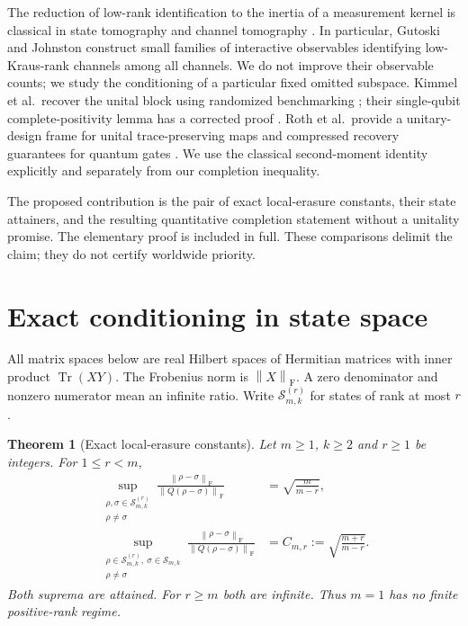 \documentclass[11pt,a4paper]{article}
\newtheorem{theorem}{Theorem}
\newcommand{\Tr}{\operatorname{Tr}}
\newcommand{\F}{\mathrm F}
\newcommand{\cS}{\mathcal S}
\newcommand{\norm}[1]{\left\lVert#1\right\rVert_{\F}}
\begin{document}
The reduction of low-rank identification to the inertia of a measurement
kernel is classical in state tomography
\cite{carmeli} and channel tomography \cite{gutoski}.
In particular, Gutoski and Johnston construct small families of
interactive observables identifying low-Kraus-rank channels among all
channels. We do not improve their observable counts; we study the
conditioning of a particular fixed omitted subspace.
Kimmel et al.\ recover the unital block using randomized benchmarking
\cite{kimmel}; their single-qubit complete-positivity lemma has a
corrected proof \cite{erratum}. Roth et al.\ provide a unitary-design
frame for unital trace-preserving maps and compressed recovery
guarantees for quantum gates \cite{roth}. We use the classical
second-moment identity explicitly and separately from our completion
inequality.

The proposed contribution is the pair of exact local-erasure constants,
their state attainers, and the resulting quantitative completion
statement without a unitality promise. The elementary proof is included
in full. These comparisons delimit the claim; they do not certify
worldwide priority.

\section{Exact conditioning in state space}
All matrix spaces below are real Hilbert spaces of Hermitian matrices
with inner product $\Tr(XY)$. The Frobenius norm is $\norm X$.
A zero denominator and nonzero numerator mean an infinite ratio.
Write $\cS^{(r)}_{m,k}$ for states of rank at most $r$.

\begin{theorem}[Exact local-erasure constants]\label{thm:sharp}
Let $m\ge1$, $k\ge2$ and $r\ge1$ be integers. For $1\le r<m$,
\begin{align}
 \sup_{\substack{\rho,\sigma\in\cS^{(r)}_{m,k}\\\rho\ne\sigma}}
 \frac{\norm{\rho-\sigma}}{\norm{Q(\rho-\sigma)}}
 &=\sqrt{\frac{m}{m-r}}, \label{eq:balanced}\\
 \sup_{\substack{\rho\in\cS^{(r)}_{m,k},\ \sigma\in\cS_{m,k}\\\rho\ne\sigma}}
 \frac{\norm{\rho-\sigma}}{\norm{Q(\rho-\sigma)}}
 &=C_{m,r}:=\sqrt{\frac{m+r}{m-r}}. \label{eq:one}
\end{align}
Both suprema are attained. For $r\ge m$ both are infinite.
Thus $m=1$ has no finite positive-rank regime.
\end{theorem}
\end{document}

